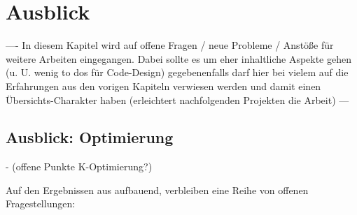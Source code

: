 \documentclass[../Report.tex]{subfiles}
\begin{document}
\chapter{Ausblick}
\label{chap:ausb}
---- In diesem Kapitel wird auf offene Fragen / neue Probleme / Anstöße für weitere Arbeiten eingegangen. Dabei sollte es um eher inhaltliche Aspekte gehen (u. U. wenig to dos für Code-Design) gegebenenfalls darf hier bei vielem auf die Erfahrungen aus den vorigen Kapiteln verwiesen werden und damit einen Übersichts-Charakter haben (erleichtert nachfolgenden Projekten die Arbeit) --- 

\section{Ausblick: Optimierung}
\label{sec:ausb.opti}

- (offene Punkte K-Optimierung?)


Auf den Ergebnissen aus  aufbauend, verbleiben eine Reihe von offenen Fragestellungen:
\end{document}
